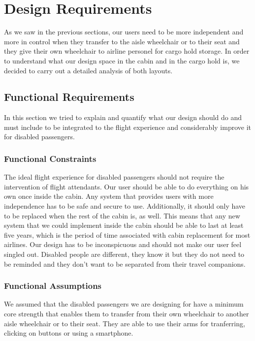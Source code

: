 \chapter{Design Requirements}

As we saw in the previous sections, our users need to be more independent and more in control when they transfer to the aisle wheelchair or to their seat and they give their own wheelchair to airline personel for cargo hold storage. In order to understand what our design space in the cabin and in the cargo hold is, we decided to carry out a detailed analysis of both layouts.

\section{Functional Requirements}

In this section we tried to explain and quantify what our design should do and must include to be integrated to the flight experience and considerably improve it for disabled passengers.

\subsection{Functional Constraints}

The ideal flight experience for disabled passengers should not require the intervention of flight attendants. Our user should be able to do everything on his own once inside the cabin. Any system that provides  users with more independence has to be safe and secure to use. Additionally, it should only have to be replaced when the rest of the cabin is, as well. This means that any new system that we could implement inside the cabin should be able to last at least five years, which is the period of time associated with cabin replacement for most airlines.
Our design has to be inconspicuous and should not make our user feel singled out. Disabled people are different, they know it but they do not need to be reminded and they don't want to be separated from their travel companions.

\subsection{Functional Assumptions}

We assumed that the disabled passengers we are designing for have a minimum core strength that enables them to transfer from their own wheelchair to another aisle wheelchair or to their seat. They are able to use their arms for tranferring, clicking on buttons or using a smartphone.

